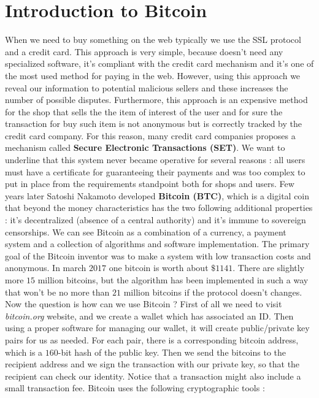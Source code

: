 \section{Introduction to Bitcoin}
When we need to buy something on the web typically we use the SSL protocol and a credit card. This approach is very simple, because doesn't need any specialized software, it's compliant with the credit card mechanism and it's one of the most used method for paying in the web. However, using this approach we reveal our information to potential malicious sellers and these increases the number of possible disputes. Furthermore, this approach is an expensive method for the shop that sells the the item of interest of the user and for sure the transaction for buy such item is not anonymous but is correctly tracked by the credit card company. For this reason, many credit card companies proposes a mechanism called \textbf{Secure Electronic Transactions (SET)}. We want to underline that this system never became operative for several reasons : all users must have a certificate for guaranteeing their payments and was too complex to put in place from the requirements standpoint both for shops and users. Few years later Satoshi Nakamoto developed \textbf{Bitcoin (BTC)}, which is a digital coin that beyond the money characteristics has the two following additional properties : it's decentralized (absence of a central authority) and it's immune to sovereign censorships. We can see Bitcoin as a combination of a currency, a payment system and a collection of algorithms and software implementation. The primary goal of the Bitcoin inventor was to make a system with low transaction costs and anonymous. In march $2017$ one bitcoin is worth about $\$ 1141$. There are slightly more $15$ million bitcoins, but the algorithm has been implemented in such a way that won't be no more than $21$ million bitcoins if the protocol doesn't changes. Now the question is how can we use Bitcoin ? First of all we need to visit \textit{bitcoin.org} website, and we create a wallet which has associated an ID. Then using a proper software for managing our wallet, it will create public/private key pairs for us as needed. For each pair, there is a corresponding bitcoin address, which is a $160$-bit hash of the public key. Then we send the bitcoins to the recipient address and we sign the transaction with our private key, so that the recipient can check our identity. Notice that a transaction might also include a small transaction fee. Bitcoin uses the following cryptographic tools :

